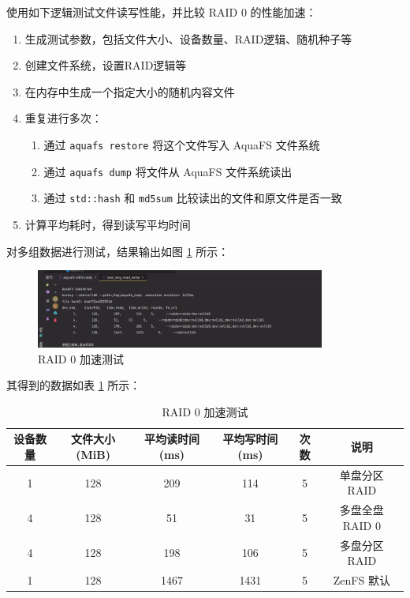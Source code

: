 使用如下逻辑测试文件读写性能，并比较 RAID 0 的性能加速：

\begin{enumerate}
  \item 生成测试参数，包括文件大小、设备数量、RAID逻辑、随机种子等
  \item 创建文件系统，设置RAID逻辑等
  \item 在内存中生成一个指定大小的随机内容文件
  \item 重复进行多次：
  \begin{enumerate}
    \item 通过 \verb|aquafs restore| 将这个文件写入 AquaFS 文件系统
    \item 通过 \verb|aquafs dump| 将文件从 AquaFS 文件系统读出
    \item 通过 \verb|std::hash| 和 \verb|md5sum| 比较读出的文件和原文件是否一致
  \end{enumerate}
  \item 计算平均耗时，得到读写平均时间
\end{enumerate}

对多组数据进行测试，结果输出如图 \ref{raid0-speedup} 所示：

\begin{figure}[htbp]
  \centering
  \includegraphics[width=0.85\textwidth]{fig/raid0-speedup}
  \caption{ RAID 0 加速测试 }
  \label{raid0-speedup}
\end{figure}

其得到的数据如表 \ref{raid0-speedup-table} 所示：

\begin{table}[htbp]
  \centering
  \caption{RAID 0 加速测试}
  \label{raid0-speedup-table}
  \begin{tabular}{cccccc}
    \hline
    \textbf{设备数量} & \textbf{文件大小(MiB)} & \textbf{平均读时间(ms)} & \textbf{平均写时间(ms)} & \textbf{次数} & \textbf{说明} \\
    \hline
    1 & 128 & 209 & 114 & 5 & 单盘分区 RAID \\
    4 & 128 & 51 & 31 & 5 &  多盘全盘 RAID 0 \\
    4 & 128 & 198 & 106 & 5 &  多盘分区 RAID \\
    1 & 128 & 1467 & 1431 & 5 &  ZenFS 默认 \\
    \hline
  \end{tabular}
\end{table}

